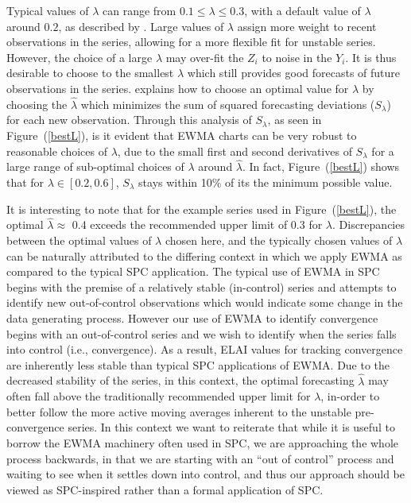 \documentclass[12pt]{article}
\def \rastLamb {
        0.4
}
\begin{document}
%
Typical values of $\lambda$ can range from \mbox{$0.1\le\lambda\le0.3$}, with a default value of $\lambda$ around $0.2$, as described by \cite{boxBook}.
%
Large values of $\lambda$ assign more weight to recent observations in the series, allowing for a more flexible fit for unstable series.
%
However, the choice of a large $\lambda$ may over-fit the $Z_i$ to noise in the $Y_i$.
%
It is thus desirable to choose to the smallest $\lambda$ which still provides good forecasts of future
observations in the series.
%
\cite[p. 87]{boxBook} explains how to choose an optimal value for $\lambda$ by choosing the $\hat\lambda$ which minimizes the sum of squared forecasting deviations ($S_\lambda$) for each new observation.
Through this analysis of $S_\lambda$, as seen in Figure~(\ref{bestL}), is it evident that EWMA charts can be very robust to reasonable choices of $\lambda$, due to the small first and second derivatives of $S_\lambda$ for a large range of sub-optimal choices of $\lambda$ around $\hat\lambda$. %
%
In fact, Figure~(\ref{bestL}) shows that for \mbox{$\lambda\in[0.2, 0.6]$,} $S_\lambda$ stays within 10\% of its the minimum possible value.

%
%

%
It is interesting to note that for the example series used in Figure~(\ref{bestL}), the optimal $\hat \lambda\approx$\rastLamb exceeds the recommended upper limit of 0.3 for $\lambda$. 
%
Discrepancies between the optimal values of $\lambda$ chosen here, and the typically chosen values of $\lambda$ can be naturally attributed to the differing context in which we apply EWMA as compared to the typical SPC application. 
The typical use of EWMA in SPC begins with the premise of a relatively stable (in-control) series and attempts to identify new out-of-control observations which would indicate some change in the data generating process.
%
However our use of EWMA to identify convergence begins with an out-of-control series and we wish to identify when the series falls into control (i.e., convergence).
%
As a result, ELAI values for tracking convergence are inherently less stable than typical SPC applications of EWMA.
Due to the decreased stability of the series, in this context, the optimal forecasting $\hat\lambda$ may often fall above the traditionally recommended upper limit for $\lambda$, in-order to better follow the more active moving averages inherent to the unstable pre-convergence series. 
%
In this context we want to reiterate that while it is useful to borrow the EWMA machinery often used in SPC, we are approaching the whole process backwards, in that we are starting with an ``out of control'' process and waiting to see when it settles down into control, and thus our approach should be viewed as SPC-inspired rather than a formal application of SPC.
\end{document}
